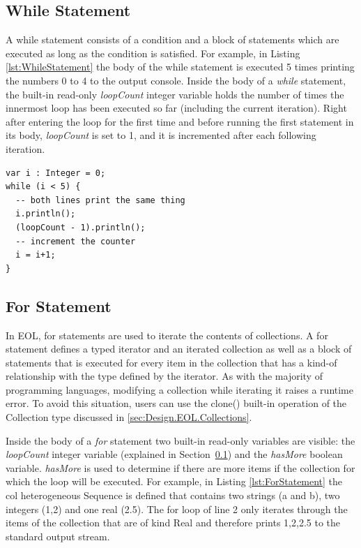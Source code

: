\subsection{While Statement}
\label{sec:while-statement}

A while statement consists of a condition and a block of statements which are executed as long as the condition is satisfied. For example, in Listing \ref{lst:WhileStatement} the body of the while statement is executed 5 times printing the numbers 0 to 4 to the output console. Inside the body of a \emph{while} statement, the built-in read-only \emph{loopCount} integer variable holds the number of times the innermost loop has been executed so far (including the current iteration). Right after entering the loop for the first time and before running the first statement in its body, \emph{loopCount} is set to 1, and it is incremented after each following iteration.

\begin{lstlisting}[basicstyle=\ttfamily\footnotesize, flexiblecolumns=true, numbers=none, nolol=true, caption=Example of a while statement, label=lst:WhileStatement, numbers=left, language=EOL, tabsize=2]
var i : Integer = 0;
while (i < 5) {
  -- both lines print the same thing
  i.println();
  (loopCount - 1).println();
  -- increment the counter
  i = i+1;
}
\end{lstlisting}

\subsection{For Statement}

In EOL, for statements are used to iterate the contents of collections. A for statement defines a typed iterator and an iterated collection as well as a block of statements that is executed for every item in the collection that has a kind-of relationship with the type defined by the iterator. As with the majority of programming languages, modifying a collection while iterating it raises a runtime error. To avoid this situation, users can use the clone() built-in operation of the Collection type discussed in \ref{sec:Design.EOL.Collections}.

Inside the body of a \emph{for} statement two built-in read-only variables are visible: the \emph{loopCount} integer variable (explained in Section~\ref{sec:while-statement}) and the \emph{hasMore} boolean variable. \emph{hasMore} is used to determine if there are more items if the collection for which the loop will be executed. For example, in Listing \ref{lst:ForStatement} the col heterogeneous Sequence is defined that contains two strings (a and b), two integers (1,2) and one real (2.5). The for loop of line 2 only iterates through the items of the collection that are of kind Real and therefore prints 1,2,2.5 to the standard output stream.

